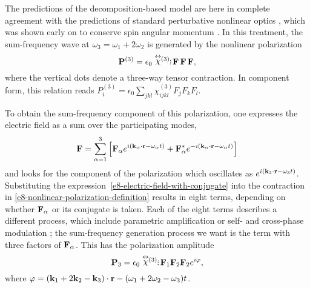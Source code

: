 The predictions of the decomposition-based model are here in complete agreement with the predictions of standard perturbative nonlinear optics \cite{VectorFourWaveMixing, AgrawalFiberOptics}, which was shown early on to conserve spin angular momentum \cite{BloembergenConservationLaws, SelectionRulesNonlinearOptics}. In this treatment, the sum-frequency wave at $\omega_3=\omega_1+2\omega_2$ is generated by the nonlinear polarization 
\begin{equation}
\vbP^{(3)}=\epsilon_0\chit
\tdots
\vbf\,\vbf\,\vbf,
\label{e8-nonlinear-polarization-definition}
\end{equation}
where the vertical dots denote a three-way tensor contraction. In component form, this relation reads $P^{(3)}_i=\epsilon_0 \sum_{jkl} \chi^{(3)}_{ijkl} F_jF_kF_l$.



To obtain the sum-frequency component of this polarization, one expresses the electric field as a sum over the participating modes, 
\begin{equation}
  \vb{F}=\sum_{\alpha=1}^3\left[
  \vb{F}_\alpha e^{i(\vb{k}_\alpha\cdot \vb{r}-\omega_\alpha t)}
  +
  \vb{F}_\alpha^\ast e^{-i(\vb{k}_\alpha\cdot \vb{r}-\omega_\alpha t)}
  \right]
  \label{e8-electric-field-with-conjugate}
\end{equation}
and looks for the component of the polarization which oscillates as $e^{i(\vb{k}_3\cdot\vb{r}-\omega_3 t)}$. Substituting the expression~\eqref{e8-electric-field-with-conjugate} into the contraction in \eqref{e8-nonlinear-polarization-definition} results in eight terms, depending on whether $\vb{F}_\alpha$ or its conjugate is taken. Each of the eight terms describes a different process, which include parametric amplification or self- and cross-phase modulation \cite{AgrawalFiberOptics}; the sum-frequency generation process we want is the term with three factors of  $\vb{F}_\alpha$. This has the polarization amplitude
\begin{equation}
\vbP_3=\epsilon_0\chit
\tdots
\vbf_1\vbf_2\vbf_2 e^{i\varphi},
\label{e8-nonlinear-polarization-amplitudes}
\end{equation}
where $\varphi=(\vb{k}_1+2\vb{k}_2-\vb{k}_3)\cdot\vb{r}-(\omega_1+2\omega_2-\omega_3)t$.





